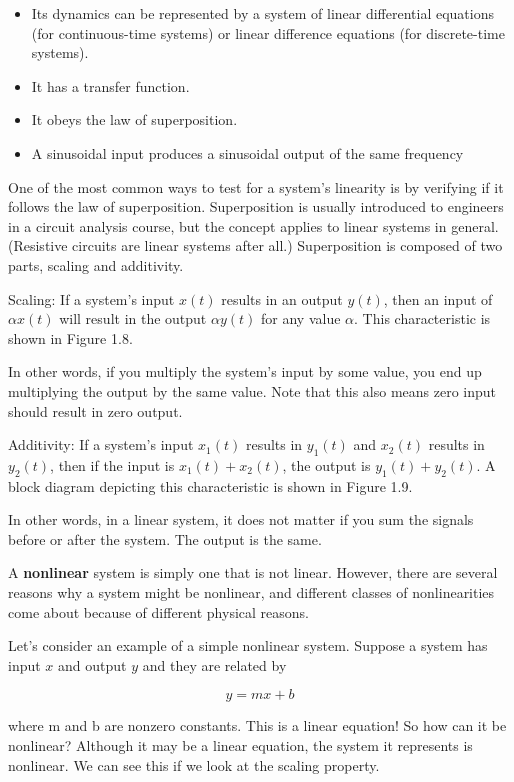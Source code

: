 \documentclass[12pt]{article}
\begin{document}
\begin{itemize}
\item Its dynamics can be represented by a system of linear differential equations
(for continuous-time systems) or linear difference equations (for
discrete-time systems).
\item It has a transfer function.
\item It obeys the law of superposition.
\item A sinusoidal input produces a sinusoidal output of the same frequency
\end{itemize}

One of the most common ways to test for a system’s linearity is by
verifying if it follows the law of superposition. Superposition is usually
introduced to engineers in a circuit analysis course, but the concept applies
to linear systems in general. (Resistive circuits are linear systems after all.)
Superposition is composed of two parts, scaling and additivity.

Scaling: If a system’s input $x(t)$ results in an output $y(t)$, then an input of
$\alpha x(t)$ will result in the output $\alpha y(t)$ for any value $\alpha$. This characteristic is
shown in Figure 1.8.

In other words, if you multiply the system’s input by some value, you
end up multiplying the output by the same value. Note that this also means
zero input should result in zero output.

Additivity: If a system’s input $x_1(t)$ results in $y_1(t)$ and $x_2(t)$ results in $y_2(t)$,
then if the input is $x_1(t) + x_2(t)$, the output is $y_1(t) + y_2(t)$. A block diagram
depicting this characteristic is shown in Figure 1.9.

In other words, in a linear system, it does not matter if you sum the
signals before or after the system. The output is the same.

A \textbf{nonlinear} system is simply one that is not linear. However, there are
several reasons why a system might be nonlinear, and different classes of
nonlinearities come about because of different physical reasons.

Let’s consider an example of a simple nonlinear system. Suppose a
system has input $x$ and output $y$ and they are related by

\[
y = m x + b 
\]

where m and b are nonzero constants. This is a linear equation! So how can
it be nonlinear? Although it may be a linear equation, the system it represents
is nonlinear. We can see this if we look at the scaling property.
\end{document}
